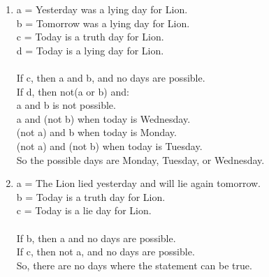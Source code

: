 \documentclass{article}
\begin{document}
\begin{enumerate}[1.]
            (not a) and (not b) is not possible. \\
        \\
        So, the only possible days are T and W.
    \item 
        a = Yesterday was a lying day for Lion. \\
        b = Tomorrow was a lying day for Lion. \\
        c = Today is a truth day for Lion. \\
        d = Today is a lying day for Lion. \\
        \\
        If c, then a and b, and no days are possible. \\
        If d, then not(a or b) and: \\
        a and b is not possible. \\
        a and (not b) when today is Wednesday. \\
        (not a) and b when today is Monday. \\
        (not a) and (not b) when today is Tuesday. \\
        So the possible days are Monday, Tuesday, or Wednesday.
    \item
    a = The Lion lied yesterday and will lie again tomorrow. \\
    b = Today is a truth day for Lion. \\
    c = Today is a lie day for Lion. \\
    \\
    If b, then a and no days are possible. \\
    If c, then not a, and no days are possible. \\
    So, there are no days where the statement can be true.
\end{enumerate}
\end{document}
